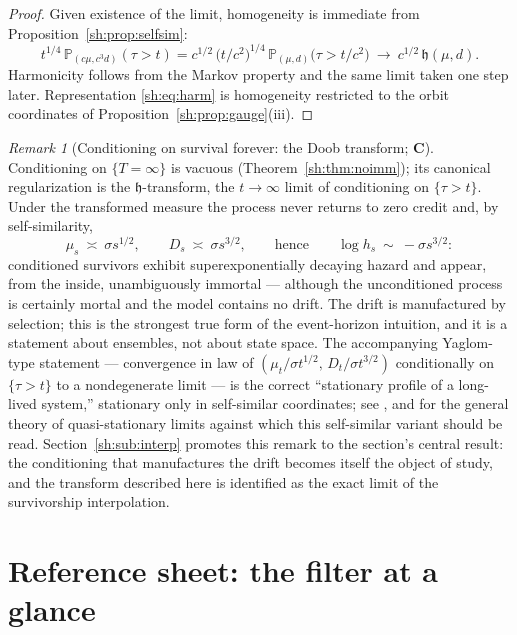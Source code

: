 \documentclass[11pt]{article}
\numberwithin{equation}{section}
\theoremstyle{plain}
\theoremstyle{definition}
\theoremstyle{remark}
\newtheorem{remark}[theorem]{Remark}
\newcommand{\PP}{\mathbb{P}}
\newcommand{\hm}{\mathfrak{h}}
\begin{document}
\begin{proof}
Given existence of the limit, homogeneity is immediate from
Proposition~\ref{sh:prop:selfsim}:
\[
t^{1/4}\,\PP_{(c\mu,c^3d)}(\tau>t)
= c^{1/2}\,\bigl(t/c^2\bigr)^{1/4}\,\PP_{(\mu,d)}\bigl(\tau>t/c^{2}\bigr)
\ \longrightarrow\ c^{1/2}\,\hm(\mu,d).
\]
Harmonicity follows from the Markov property and the same limit taken one
step later. Representation \eqref{sh:eq:harm} is homogeneity restricted to
the orbit coordinates of Proposition~\ref{sh:prop:gauge}(iii).
\end{proof}

\begin{remark}[Conditioning on survival forever: the Doob transform;
\textbf{C}]\label{sh:rem:doob}
Conditioning on $\{T=\infty\}$ is vacuous (Theorem~\ref{sh:thm:noimm});
its canonical regularization is the $\hm$-transform, the
$t\to\infty$ limit of conditioning on $\{\tau>t\}$. Under the transformed
measure the process never returns to zero credit and, by self-similarity,
\[
\mu_s\ \asymp\ \sigma s^{1/2},\qquad D_s\ \asymp\ \sigma s^{3/2},
\qquad\text{hence}\qquad \log h_s\ \sim\ -\sigma s^{3/2}:
\]
conditioned survivors exhibit superexponentially decaying hazard and
appear, from the inside, unambiguously immortal --- although the
unconditioned process is certainly mortal and the model contains no drift.
The drift is manufactured by selection; this is the strongest true form of
the event-horizon intuition, and it is a statement about ensembles, not
about state space. The accompanying Yaglom-type statement --- convergence
in law of $(\mu_t/\sigma t^{1/2},\,D_t/\sigma t^{3/2})$ conditionally on
$\{\tau>t\}$ to a nondegenerate limit --- is the correct
``stationary profile of a long-lived system,'' stationary only in
self-similar coordinates; see \cite{GJW99,AS15}, and \cite{MV12} for
the general theory of quasi-stationary limits against which this
self-similar variant should be read.
Section~\ref{sh:sub:interp} promotes this remark to the section's central
result: the conditioning that manufactures the drift becomes itself the
object of study, and the transform described here is identified as the
exact limit of the survivorship interpolation.
\end{remark}

\section{Reference sheet: the filter at a glance}\label{app:sheet}
\end{document}
